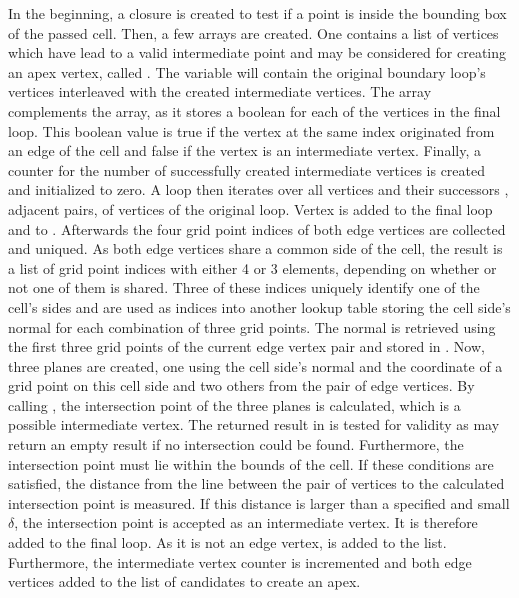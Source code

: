 %
In the beginning, a closure is created to test if a point is inside the bounding box of the passed cell.
Then, a few arrays are created.
One contains a list of vertices which have lead to a valid intermediate point and may be considered for creating an apex vertex, called .
The variable  will contain the original boundary loop's vertices interleaved with the created intermediate vertices.
The  array complements the  array, as it stores a boolean for each of the vertices in the final loop.
This boolean value is true if the vertex at the same index originated from an edge of the cell and false if the vertex is an intermediate vertex.
Finally, a counter for the number of successfully created intermediate vertices is created and initialized to zero.
A loop then iterates over all vertices  and their successors , \ie adjacent pairs, of vertices of the original loop.
Vertex  is added to the final loop and \True to .
Afterwards the four grid point indices of both edge vertices are collected and uniqued.
As both edge vertices share a common side of the cell, the result is a list of grid point indices with either 4 or 3 elements, depending on whether or not one of them is shared.
Three of these indices uniquely identify one of the cell's sides and are used as indices into another lookup table storing the cell side's normal for each combination of three grid points. %
The normal is retrieved using the first three grid points of the current edge vertex pair and stored in .
Now, three planes are created, one using the cell side's normal and the coordinate of a grid point on this cell side and two others from the pair of edge vertices.
By calling , the intersection point of the three planes is calculated, which is a possible intermediate vertex.
The returned result in  is tested for validity as  may return an empty result if no intersection could be found.
Furthermore, the intersection point must lie within the bounds of the cell.
If these conditions are satisfied, the distance from the line between the pair of vertices to the calculated intersection point is measured.
If this distance is larger than a specified and small $\delta$, the intersection point is accepted as an intermediate vertex.
It is therefore added to the final loop.
As it is not an edge vertex, \False is added to the  list.
Furthermore, the intermediate vertex counter is incremented and both edge vertices added to the list of candidates to create an apex.

